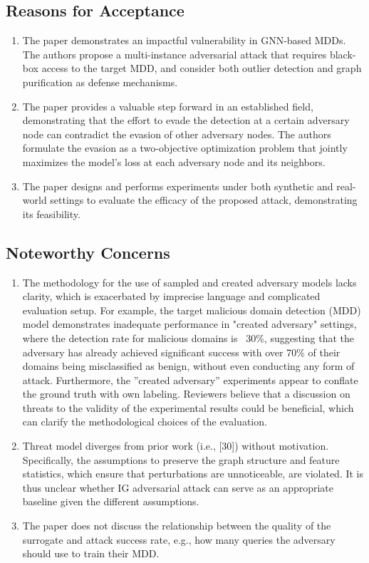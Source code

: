 \documentclass[conference,compsoc]{IEEEtran}
\begin{document}
\subsection{Reasons for Acceptance}
\begin{enumerate}
\item The paper demonstrates an impactful vulnerability in GNN-based MDDs. The authors propose a multi-instance adversarial attack that requires black-box access to the target MDD, and consider both outlier detection and graph purification as defense mechanisms.
\item The paper provides a valuable step forward in an established field, demonstrating that the effort to evade the detection at a certain adversary node can contradict the evasion of other adversary nodes. The authors formulate the evasion as a two-objective optimization problem that jointly maximizes the model's loss at each adversary node and its neighbors.
\item The paper designs and performs experiments under both synthetic and real-world settings to evaluate the efficacy of the proposed attack, demonstrating its feasibility.
\end{enumerate}

\subsection{Noteworthy Concerns} %
\begin{enumerate} %
\item The methodology for the use of sampled and created adversary models lacks clarity, which is exacerbated by imprecise language and complicated evaluation setup. For example, the target malicious domain detection (MDD) model demonstrates inadequate performance in "created adversary" settings, where the detection rate for malicious domains is ~30\%, suggesting that the adversary has already achieved significant success with over 70\% of their domains being misclassified as benign, without even conducting any form of attack. Furthermore, the ''created adversary'' experiments appear to conflate the ground truth with own labeling. Reviewers believe that a discussion on threats to the validity of the experimental results could be beneficial, which can clarify the methodological choices of the evaluation.
\item Threat model diverges from prior work (i.e., [30]) without motivation. Specifically, the assumptions to preserve the graph structure and feature statistics, which ensure that perturbations are unnoticeable, are violated. It is thus unclear whether IG adversarial attack can serve as an appropriate baseline given the different assumptions.
\item The paper does not discuss the relationship between the quality of the surrogate and attack success rate, e.g., how many queries the adversary should use to train their MDD.
\end{enumerate}
\end{document}
